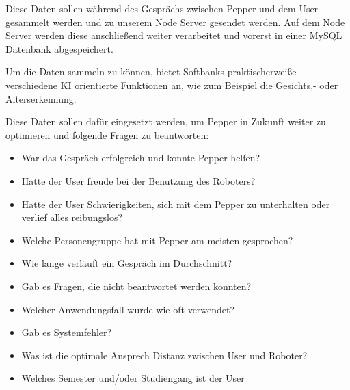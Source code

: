 Diese Daten sollen während des Gesprächs zwischen Pepper und dem User gesammelt werden und zu unserem Node Server gesendet werden.
Auf dem Node Server werden diese anschließend weiter verarbeitet und vorerst in einer MySQL Datenbank abgespeichert.

Um die Daten sammeln zu können, bietet Softbanks praktischerweiße verschiedene KI orientierte Funktionen an, wie zum Beispiel die Gesichts,- oder Alterserkennung.

Diese Daten sollen dafür eingesetzt werden, um Pepper in Zukunft weiter zu optimieren und folgende Fragen zu beantworten:
\begin{itemize}
    \item War das Gespräch erfolgreich und konnte Pepper helfen?
    \item Hatte der User freude bei der Benutzung des Roboters?
    \item Hatte der User Schwierigkeiten, sich mit dem Pepper zu unterhalten oder verlief alles reibungslos?
    \item Welche Personengruppe hat mit Pepper am meisten gesprochen?
    \item Wie lange verläuft ein Gespräch im Durchschnitt?
    \item Gab es Fragen, die nicht beantwortet werden konnten?
    \item Welcher Anwendungsfall wurde wie oft verwendet?
    \item Gab es Systemfehler?
    \item Was ist die optimale Ansprech Distanz zwischen User und Roboter?
    \item Welches Semester und/oder Studiengang ist der User
\end{itemize}